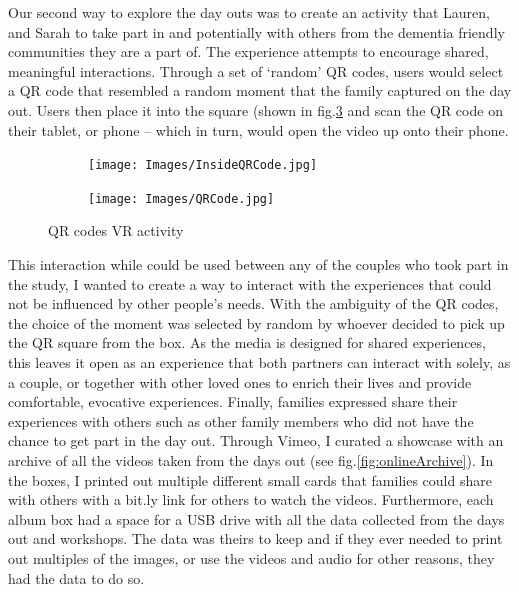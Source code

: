 Our second way to explore the day outs was to create an activity that Lauren, and Sarah to take part in and potentially with others from the dementia friendly communities they are a part of. The experience attempts to encourage shared, meaningful interactions. Through a set of ‘random’ QR codes, users would select a QR code that resembled a random moment that the family captured on the day out. Users then place it into the square (shown in fig.\ref{fig:QRcodes} and scan the QR code on their tablet, or phone – which in turn, would open the video up onto their phone.

\begin{figure}
\centering
\begin{subfigure}{.5\textwidth}
  \centering
  \texttt{[image: Images/InsideQRCode.jpg]}
  \label{fig:insideQRBox}
\end{subfigure}%
\begin{subfigure}{.5\textwidth}
  \centering
  \texttt{[image: Images/QRCode.jpg]}
  \label{fig:QRCode}
\end{subfigure}
\caption{QR codes VR activity}
\label{fig:QRcodes}
\end{figure}

This interaction while could be used between any of the couples who took part in the study, I wanted to create a way to interact with the experiences that could not be influenced by other people’s needs. With the ambiguity of the QR codes, the choice of the moment was selected by random by whoever decided to pick up the QR square from the box. As the media is designed for shared experiences, this leaves it open as an experience that both partners can interact with solely, as a couple, or together with other loved ones to enrich their lives and provide comfortable, evocative experiences. Finally, families expressed share their experiences with others such as other family members who did not have the chance to get part in the day out. Through Vimeo, I curated a showcase with an archive of all the videos taken from the days out (see fig.\ref{fig:onlineArchive}). In the boxes, I printed out multiple different small cards that families could share with others with a bit.ly link for others to watch the videos. Furthermore, each album box had a space for a USB drive with all the data collected from the days out and workshops. The data was theirs to keep and if they ever needed to print out multiples of the images, or use the videos and audio for other reasons, they had the data to do so. 

